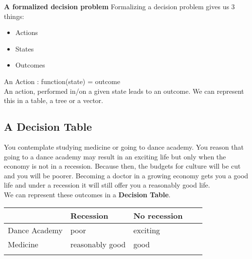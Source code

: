 \documentclass{article}
\begin{document}
    \bigbreak \textbf{A formalized decision problem}
    Formalizing a decision problem gives us 3 things:
    \begin{itemize}
        \item Actions
        \item States
        \item Outcomes
    \end{itemize}
    An Action : function(state) = outcome
    \\An action, performed in/on a given state leads to an outcome. We can represent this in a table, a tree or a vector.
    \subsection{A Decision Table}
    You contemplate studying medicine or going to dance academy. You reason that going to a dance academy may result in an exciting life but only when the economy is not in a recession. Because then, the budgets for culture will be cut and you will be poorer. Becoming a doctor in a growing economy gets you a good life and under a recession it will still offer you a reasonably good life.
    \\We can represent these outcomes in a \textbf{Decision Table}.
        \begin{table}[h!]
        \begin{tabular}{l|llll}
                      & Recession       & No recession &  &  \\ \hline
        Dance Academy & poor            & exciting     &  &  \\
        Medicine      & reasonably good & good         &  &  \\
                      &                 &              &  & 
        \end{tabular}
        \end{table}
\end{document}
